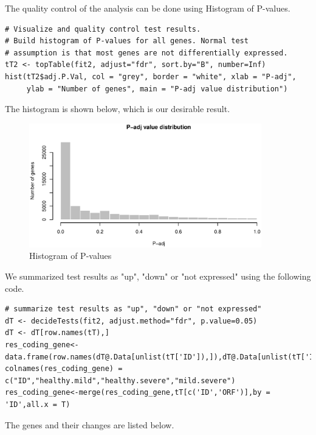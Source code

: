 \documentclass[en,black,12pt,normal]{elegantnote}
\begin{document}
The quality control of the analysis can be done using Histogram of P-values.
\begin{lstlisting}
# Visualize and quality control test results.
# Build histogram of P-values for all genes. Normal test
# assumption is that most genes are not differentially expressed.
tT2 <- topTable(fit2, adjust="fdr", sort.by="B", number=Inf)
hist(tT2$adj.P.Val, col = "grey", border = "white", xlab = "P-adj",
     ylab = "Number of genes", main = "P-adj value distribution")
\end{lstlisting}
The histogram is shown below, which is our desirable result.
\begin{figure}[H]
    \centering
    \includegraphics[width=0.9\textwidth]{image/P_Dist.eps}
    \caption{Histogram of P-values}
    \label{PValue}
\end{figure}

We summarized test results as "up", "down" or "not expressed" using the following code.
\begin{lstlisting}
# summarize test results as "up", "down" or "not expressed"
dT <- decideTests(fit2, adjust.method="fdr", p.value=0.05)
dT <- dT[row.names(tT),]
res_coding_gene<-data.frame(row.names(dT@.Data[unlist(tT['ID']),]),dT@.Data[unlist(tT['ID']),])
colnames(res_coding_gene) = c("ID","healthy.mild","healthy.severe","mild.severe")
res_coding_gene<-merge(res_coding_gene,tT[c('ID','ORF')],by = 'ID',all.x = T)
\end{lstlisting}

The genes and their changes are listed below.
\end{document}

